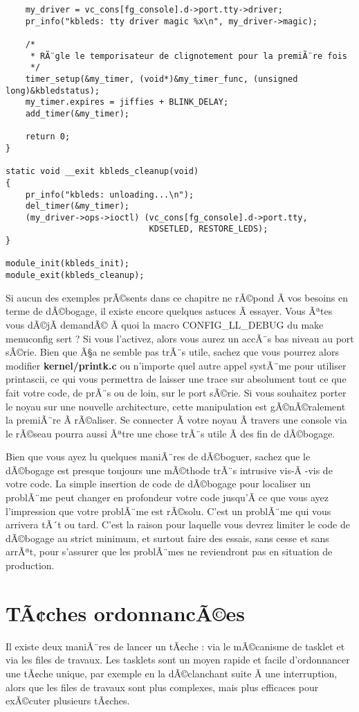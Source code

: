 \documentclass[11pt]{article}
\begin{document}
\begin{verbatim}
    my_driver = vc_cons[fg_console].d->port.tty->driver;
    pr_info("kbleds: tty driver magic %x\n", my_driver->magic);

    /*
     * RÃ¨gle le temporisateur de clignotement pour la premiÃ¨re fois
     */
    timer_setup(&my_timer, (void*)&my_timer_func, (unsigned long)&kbledstatus);
    my_timer.expires = jiffies + BLINK_DELAY;
    add_timer(&my_timer);

    return 0;
}

static void __exit kbleds_cleanup(void)
{
    pr_info("kbleds: unloading...\n");
    del_timer(&my_timer);
    (my_driver->ops->ioctl) (vc_cons[fg_console].d->port.tty,
                             KDSETLED, RESTORE_LEDS);
}

module_init(kbleds_init);
module_exit(kbleds_cleanup);
\end{verbatim}

Si aucun des exemples prÃ©sents dans ce chapitre ne rÃ©pond Ã  vos besoins en terme de dÃ©bogage, il existe encore quelques astuces Ã  essayer. Vous Ãªtes vous dÃ©jÃ  demandÃ© Ã  quoi la macro CONFIG\_LL\_DEBUG du make menuconfig sert ? Si vous l'activez, alors vous aurez un accÃ¨s bas niveau au port sÃ©rie. Bien que Ã§a ne semble pas trÃ¨s utile, sachez que vous pourrez alors modifier \textbf{kernel/printk.c} ou n'importe quel autre appel systÃ¨me pour utiliser printascii, ce qui vous permettra de laisser une trace sur absolument tout ce que fait votre code, de prÃ¨s ou de loin, sur le port sÃ©rie. Si vous souhaitez porter le noyau sur une nouvelle architecture, cette manipulation est gÃ©nÃ©ralement la premiÃ¨re Ã  rÃ©aliser. Se connecter Ã  votre noyau Ã  travers une console via le rÃ©seau pourra aussi Ãªtre une chose trÃ¨s utile Ã  des fin de dÃ©bogage.

Bien que vous ayez lu quelques maniÃ¨res de dÃ©boguer, sachez que le dÃ©bogage est presque toujours une mÃ©thode trÃ¨s intrusive vis-Ã -vis de votre code. La simple insertion de code de dÃ©bogage pour localiser un problÃ¨me peut changer en profondeur votre code jusqu'Ã  ce que vous ayez l'impression que votre problÃ¨me est rÃ©solu. C'est un problÃ¨me qui vous arrivera tÃ´t ou tard. C'est la raison pour laquelle vous devrez limiter le code de dÃ©bogage au strict minimum, et surtout faire des essais, sans cesse et sans arrÃªt, pour s'assurer que les problÃ¨mes ne reviendront pas en situation de production.

\section*{TÃ¢ches ordonnancÃ©es}
\label{sec-14}
Il existe deux maniÃ¨res de lancer un tÃ¢che : via le mÃ©canisme de tasklet et via les files de travaux. Les tasklets sont un moyen rapide et facile d'ordonnancer une tÃ¢che unique, par exemple en la dÃ©clanchant suite Ã  une interruption, alors que les files de travaux sont plus complexes, mais plus efficaces pour exÃ©cuter plusieurs tÃ¢ches.
\end{document}
